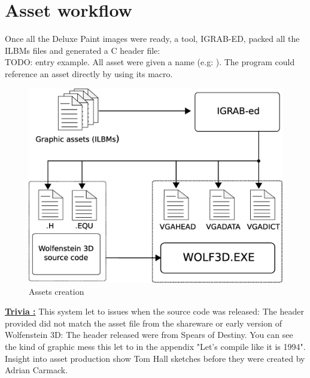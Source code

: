 \documentclass[book.tex]{subfiles}
\begin{document}
\section{Asset workflow}
Once all the Deluxe Paint images were ready, a tool, IGRAB-ED, packed all the ILBMs files and generated a C header file:\\
TODO: entry example. All asset were given a name (e.g: ). 
 The program could reference an asset directly by using its macro.\\
\begin{figure}[H]
\centering
 \includegraphics[width=\textwidth]{imgs/drawing_plain.eps}
 \caption{Assets creation} \label{fig:mips}
 \end{figure}

\textbf{\underline{Trivia :}} This system let to issues when the source code was released: The header provided did not match the asset file from the shareware or early version of Wolfenstein 3D: The header released were from Spears of Destiny. You can see the kind of graphic mess this let to in the appendix "Let's compile like it is 1994".\\

Insight into asset production show Tom Hall sketches before they were created by Adrian Carmack.\\
\end{document}
